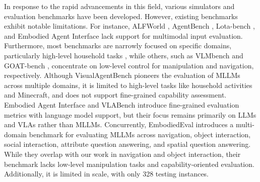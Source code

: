 In response to the rapid advancements in this field, various simulators \cite{kolve2017ai2, puig2018virtualhome, shridhar2020alfred, xiang2020sapien, shen2021igibson, li2021igibson, li2023behavior, nasiriany2024robocasa} and evaluation benchmarks \cite{shridhar2020alfworld,shridhar2020alfred,zheng2022vlmbench,li2023behavior,szot2023large,luo2023fmb,ijcai2024p15,koh2024visualwebarena,choi2024lota,khanna2024goat,liu2024visualagentbench,li2024embodied,zhang2024vlabench,song2024towards} have been developed. However, existing benchmarks exhibit notable limitations. For instance, ALFWorld \cite{shridhar2020alfworld}, AgentBench \cite{liu2023agentbench}, Lota-bench \cite{choi2024lota}, and Embodied Agent Interface \cite{li2024embodied} lack support for multimodal input evaluation. Furthermore, most benchmarks are narrowly focused on specific domains, particularly high-level household tasks \cite{shridhar2020alfred, li2023behavior, szot2023large}, while others, such as VLMbench \cite{zheng2022vlmbench} and GOAT-bench \cite{khanna2024goat}, concentrate on low-level control for manipulation and navigation, respectively. Although VisualAgentBench \cite{liu2024visualagentbench} pioneers the evaluation of MLLMs across multiple domains, it is limited to high-level tasks like household activities and Minecraft, and does not support fine-grained capability assessment. Embodied Agent Interface \cite{li2024embodied} and VLABench \cite{zhang2024vlabench} introduce fine-grained evaluation metrics with language model support, but their focus remains primarily on LLMs and VLAs rather than MLLMs. Concurrently, EmbodiedEval \cite{cheng2025embodiedeval} introduces a multi-domain benchmark for evaluating MLLMs across navigation, object interaction, social interaction, attribute question answering, and spatial question answering. While they overlap with our work in navigation and object interaction, their benchmark lacks low-level manipulation tasks and capability-oriented evaluation. Additionally, it is limited in scale, with only 328 testing instances.




